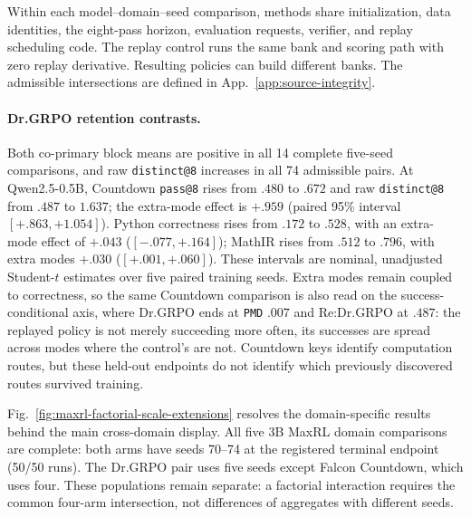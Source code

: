\documentclass{article}
\newcommand{\1}{\mathbf 1}
\newcommand{\pmd}{\texttt{PMD}}
\theoremstyle{remark}
\theoremstyle{definition}
\theoremstyle{plain}
\begin{document}
Within each model--domain--seed comparison, methods share initialization,
data identities, the eight-pass horizon, evaluation requests, verifier, and
replay scheduling code. The replay control runs the same bank and scoring
path with zero replay derivative. Resulting policies can build different
banks. The admissible intersections are defined in
App.~\ref{app:source-integrity}.

\crossscaletablematerial

\paragraph{Dr.GRPO retention contrasts.}
\label{app:retention-numerical-detail}
Both co-primary block means are positive in all 14 complete five-seed
comparisons, and raw \texttt{distinct@8} increases in all 74 admissible pairs.
At Qwen2.5-0.5B, Countdown \texttt{pass@8} rises from $.480$ to $.672$ and
raw \texttt{distinct@8} from $.487$ to $1.637$; the extra-mode effect is
$+.959$ (paired 95\% interval $[+.863,+1.054]$). Python correctness rises
from $.172$ to $.528$, with an extra-mode effect of $+.043$
($[-.077,+.164]$); MathIR rises from $.512$ to $.796$, with extra modes
$+.030$ ($[+.001,+.060]$). These intervals are nominal, unadjusted
Student-$t$ estimates over five paired training seeds. Extra modes remain
coupled to correctness, so the same Countdown comparison is also read on the
success-conditional axis, where Dr.GRPO ends at \pmd{} $.007$ and
Re:Dr.GRPO at $.487$: the replayed policy is not merely succeeding more
often, its successes are spread across modes where the control's are not. Countdown keys identify computation routes, but
these held-out endpoints do not identify which previously discovered
routes survived training.



Fig.~\ref{fig:maxrl-factorial-scale-extensions} resolves the domain-specific
results behind the main cross-domain display. All five 3B MaxRL domain comparisons are complete:
both arms have seeds 70--74 at the registered terminal endpoint (50/50 runs).
The Dr.GRPO pair uses five seeds except Falcon Countdown, which uses four. These populations
remain separate: a factorial interaction requires the common four-arm
intersection, not differences of aggregates with different seeds.
\end{document}
